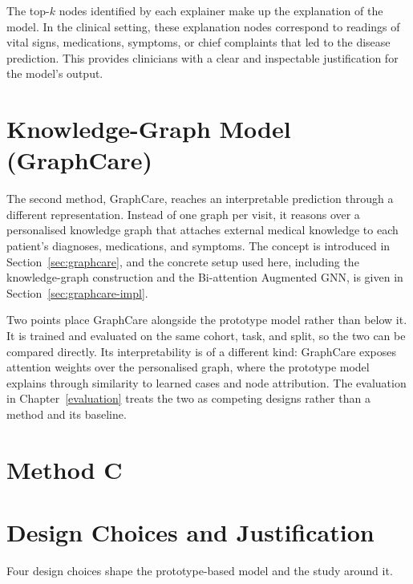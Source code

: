 The top-$k$ nodes identified by each explainer make up the explanation of the model. In the clinical setting, these
explanation nodes correspond to readings of vital signs, medications, symptoms, or chief complaints that led to the disease prediction. This provides clinicians with a clear and inspectable justification for the model's output.

\section{Knowledge-Graph Model (GraphCare)}\label{sec:pillar-graphcare}

The second method, GraphCare, reaches an interpretable prediction through a different representation. Instead of one graph per visit, it reasons over a personalised knowledge graph that attaches external medical knowledge to each patient's diagnoses, medications, and symptoms. The concept is introduced in Section~\ref{sec:graphcare}, and the concrete setup used here, including the knowledge-graph construction and the Bi-attention Augmented GNN, is given in Section~\ref{sec:graphcare-impl}.

Two points place GraphCare alongside the prototype model rather than below it. It is trained and evaluated on the same cohort, task, and split, so the two can be compared directly. Its interpretability is of a different kind: GraphCare exposes attention weights over the personalised graph, where the prototype model explains through similarity to learned cases and node attribution. The evaluation in Chapter~\ref{evaluation} treats the two as competing designs rather than a method and its baseline.

\section{Method C}\label{sec:pillar-methodc}


\section{Design Choices and Justification}

Four design choices shape the prototype-based model and the study around it.

